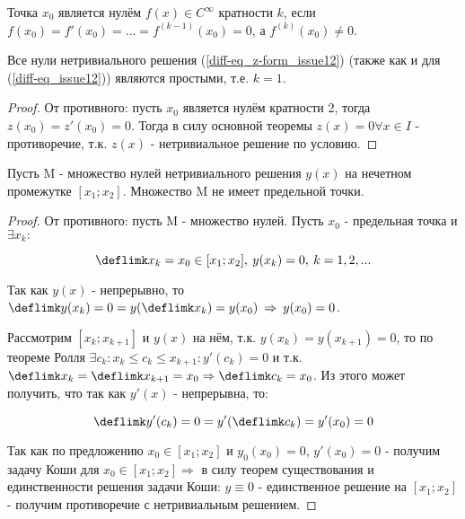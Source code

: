 \begin{definition}
Точка $x_0$ является нулём $f(x) \in C^{\infty}$ кратности $k$, если $f(x_0) = f'(x_0) = ... = f^{(k-1)}(x_0) = 0$, а $f^{(k)}(x_0) \neq 0$.
\end{definition}

\begin{lemma}\label{sol-zeros_issue12}
Все нули нетривиального решения (\ref{diff-eq_z-form_issue12}) (также как и для (\ref{diff-eq_issue12})) являются простыми, т.е. $k = 1$.
\end{lemma}

\begin{proof}
От противного: пусть $x_0$ является нулём кратности 2, тогда $z(x_0) = z'(x_0) = 0$. Тогда в силу основной теоремы $z(x) = 0 \forall x \in I$ - противоречие, т.к. $z(x)$ - нетривиальное решение по условию.
\end{proof}

\begin{lemma}\label{sol-set_issue12}
Пусть M - множество нулей нетривиального решения $y(x)$ на нечетном промежутке $[x_1;x_2]$. Множество M не имеет предельной точки.
\end{lemma}

\begin{proof}
От противного: пусть M - множество нулей. Пусть $x_0$ - предельная точка и $\exists {x_k} :$ 

\[\deflimk x_k = x_0 \in [x_1;x_2], \: y(x_k) = 0, \: k = 1,2,...\]

Так как $y(x)$ - непрерывно, то $\deflimk y(x_k) = 0 = y (\deflimk x_k) = y(x_0) \: \Rightarrow \: y(x_0) = 0$.

Рассмотрим $[x_k;x_{k+1}]$ и $y(x)$ на нём, т.к. $y(x_k) = y(x_{k+1}) = 0$, то по теореме Ролля $\exists c_k: x_k \leq c_k \leq x_{k+1}: y'(c_k) = 0$ и т.к. $\deflimk x_k = \deflimk x_{k+1} = x_0 \Rightarrow \deflimk c_k = x_0$. Из этого может получить, что так как $y'(x)$ - непрерывна, то:

\[\deflimk y' (c_k) = 0 = y' (\deflimk c_k) = y'(x_0) = 0\]

Так как по предложению $x_0 \in [x_1;x_2]$ и $y_0(x_0) = 0$, $y'(x_0) = 0$ - получим задачу Коши для $x_0 \in [x_1;x_2] \Rightarrow$ в силу теорем существования и единственности решения задачи Коши: $y\equiv 0$ - единственное решение на $[x_1;x_2]$ - получим противоречие с нетривиальным решением.
\end{proof}

